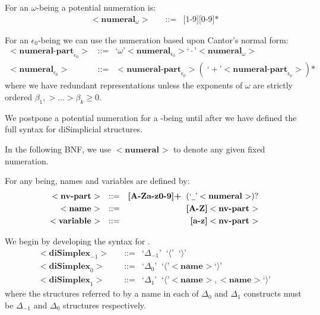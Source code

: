 \documentclass[a4paper,openany]{amsbook}
\begin{document}
\newcommand{\bnf}[2]{\ensuremath{<\textbf{#1}_{#2}>}}
\newcommand{\bnfAssign}{\text{::=}}
\newcommand{\bnfT}[1]{\text{`}#1\text{'}}

For an $\omega$-being a potential numeration is:
%
\begin{align*}
%
\bnf{numeral}{\omega} \quad & \bnfAssign & \text{[1-9]}\text{[0-9]*}
%
\end{align*}
%

For an $\epsilon_0$-being we can use the numeration based upon Cantor's normal
form:
%
\begin{align*}
%
\bnf{numeral-part}{\epsilon_0} \quad & \bnfAssign & 
  \bnfT{\omega} \bnf{numeral}{\epsilon_0} \bnfT{\cdot} \bnf{numeral}{\omega} \\
%
\bnf{numeral}{\epsilon_0} \quad & \bnfAssign & 
  \bnf{numeral-part}{\epsilon_0} ( \; \bnfT{+} \bnf{numeral-part}{\epsilon_0} ) \text{*}
%
\end{align*}
%
where we have redundant representations unless the exponents of $\omega$ are
strictly ordered $\beta_1, > \ldots > \beta_k \ge 0$.

We postpone a potential numeration for a \Cardinal-being until after we have
defined the full syntax for diSimplicial structures.

In the following BNF, we use \bnf{numeral}{} to denote any given fixed
numeration.

For any being, names and variables are defined by:
%
\begin{align*}
%
\bnf{nv-part}{} \quad & \bnfAssign & 
  \textbf{[A-Za-z0-9]+} \;\; ( \bnfT{\underline{\hspace{1ex} }} \bnf{numeral}{} )\text{?} \\
%
\bnf{name}{} \quad & \bnfAssign & \textbf{[A-Z]} \bnf{nv-part}{} \\
%
\bnf{variable}{} \quad & \bnfAssign & \textbf{[a-z]} \bnf{nv-part}{}
%
\end{align*}

We begin by developing the syntax for .
%
\begin{align*}
%
\bnf{diSimplex}{-1} \quad & \bnfAssign & \bnfT{\Delta_{-1}} \;\; \bnfT{\langle} \;\; \bnfT{\rangle} \\
%
\bnf{diSimplex}{0} \quad & \bnfAssign & \bnfT{\Delta_0} \;\; \bnfT{\langle} \bnf{name}{} \bnfT{\rangle} \\
%
\bnf{diSimplex}{1} \quad & \bnfAssign & 
  \bnfT{\Delta_1} \;\; \bnfT{\langle} \bnf{name}{}, \bnf{name}{} \bnfT{\rangle}
%
\end{align*}
%
where the structures referred to by a name in each of $\Delta_0$ and $\Delta_1$
constructs must be $\Delta_{-1}$ and $\Delta_0$ structures respectively.
\end{document}
